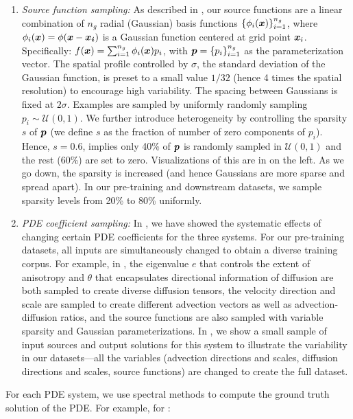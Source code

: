 \begin{enumerate}[leftmargin=5ex,nosep]
    \item \textit{Source function sampling:} As described in , our source functions are a linear combination of $n_g$ radial (Gaussian) basis functions $\{\phi_i(\boldsymbol{x})\}_{i=1}^{n_g}$, where $\phi_i(\boldsymbol{x}) = \phi(\boldsymbol{x} - \boldsymbol{x_i})$ is a Gaussian function centered at grid point $\boldsymbol{x}_i$. Specifically: $f(\boldsymbol{x}) = \sum_{i = 1}^{n_g} \phi_i(\boldsymbol{x}) p_i$, 
with $\boldsymbol{p} = \{p_i\}_{i=1}^{n_g}$ as the parameterization vector. 
The
spatial profile controlled by $\sigma$, the standard deviation of the Gaussian
function, is preset to a small value $1/32$ (hence 4 times the spatial resolution) to encourage high variability. The spacing between Gaussians is fixed at $2\sigma$. Examples are
sampled by uniformly randomly sampling $p_i \sim \mathcal{U}(0,1)$. 
We further introduce heterogeneity by controlling the sparsity $s$ of $\boldsymbol{p}$ (we define $s$  as the fraction of number of zero components of $p_i$). Hence, $s = 0.6$, implies only 40\% of $\boldsymbol{p}$ is randomly sampled in $\mathcal{U}(0,1)$ and the rest (60\%) are set to zero. Visualizations of this are in  on the left. As we go down, the sparsity is increased (and hence Gaussians are more sparse and spread apart). In our pre-training and downstream datasets, we sample sparsity levels from 20\% to 80\% uniformly. 
   \item \textit{PDE coefficient sampling:} 
   In , we have showed the systematic effects of changing certain PDE coefficients for the three systems. For our pre-training datasets, all inputs are simultaneously changed to obtain a diverse training corpus. For example, in \sysB{}, the eigenvalue $e$ that controls the extent of anisotropy and $\theta$ that encapsulates directional information of diffusion are both sampled to create diverse diffusion tensors, the velocity direction and scale are sampled to create different advection vectors as well as advection-diffusion ratios, and the source functions are also sampled with variable sparsity and Gaussian parameterizations.
   In , we show a small sample of input sources and output solutions for this system to illustrate the variability in our datasets---all the variables (advection directions and scales, diffusion directions and scales, source functions) are changed to create the full dataset.
\end{enumerate} 
For each PDE system, we use spectral methods to compute the ground truth solution of the PDE. For example, for \sysA{}:
